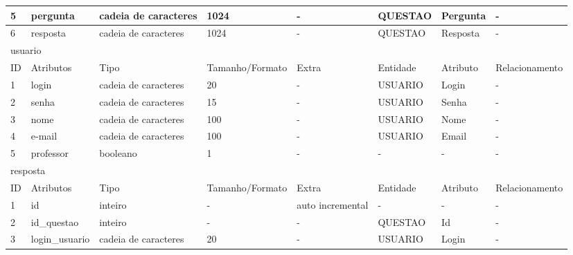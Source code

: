 \documentclass[graduacao,brazil]{ThesisPUC}
\begin{document}
\begin{table}[H]
{\begin{tabular}{|l|l|l|l|l|l|l|l|}
    5                       & pergunta       & cadeia de caracteres & 1024            & -                & QUESTAO         & Pergunta       & -               \\ \hline
    6                       & resposta       & cadeia de caracteres & 1024            & -                & QUESTAO         & Resposta       & -               \\ \hline
    \multicolumn{8}{|l|}{usuario} \\ \hline
    ID                      & Atributos      & Tipo                 & Tamanho/Formato & Extra            & Entidade        & Atributo       & Relacionamento  \\ \hline
    1                       & login          & cadeia de caracteres & 20              & -                & USUARIO         & Login          & -               \\ \hline
    2                       & senha          & cadeia de caracteres & 15              & -                & USUARIO         & Senha          & -               \\ \hline
    3                       & nome           & cadeia de caracteres & 100             & -                & USUARIO         & Nome           & -               \\ \hline
    4                       & e-mail         & cadeia de caracteres & 100             & -                & USUARIO         & Email          & -               \\ \hline
    5                       & professor      & booleano             & 1               & -                & -               & -              & -               \\ \hline
    \multicolumn{8}{|l|}{resposta} \\ \hline
    ID                      & Atributos      & Tipo                 & Tamanho/Formato & Extra            & Entidade        & Atributo       & Relacionamento  \\ \hline
    1                       & id             & inteiro              & -               & auto incremental & -               & -              & -               \\ \hline
    2                       & id\_questao    & inteiro              & -               & -                & QUESTAO         & Id             & -               \\ \hline
    3                       & login\_usuario & cadeia de caracteres & 20              & -                & USUARIO         & Login          & -               \\ \hline

\end{tabular}}
\end{table}
\end{document}
